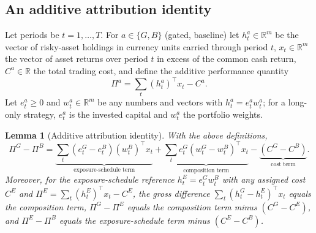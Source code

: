 \documentclass[11pt]{article}
\newtheorem{lemma}[proposition]{Lemma}
\theoremstyle{remark}
\begin{document}
\subsection{An additive attribution identity}

Let periods be $t=1,\dots,T$. For $a\in\{G,B\}$ (gated, baseline) let $h_t^a\in\mathbb{R}^m$ be
the vector of risky-asset holdings in currency units carried through period $t$,
$x_t\in\mathbb{R}^m$ the vector of asset returns over period $t$ in excess of the common cash
return, $C^a\in\mathbb{R}$ the total trading cost, and define the additive performance quantity
\[
\Pi^a=\sum_t(h_t^a)^\top x_t-C^a .
\]
Let $e_t^a\ge0$ and $w_t^a\in\mathbb{R}^m$ be any numbers and vectors with
$h_t^a=e_t^aw_t^a$; for a long-only strategy, $e_t^a$ is the invested capital and $w_t^a$ the
portfolio weights.

\begin{lemma}[Additive attribution identity]
\label{lem:attribution}
With the above definitions,
\begin{equation}
\Pi^G-\Pi^B
=\underbrace{\sum_t(e_t^G-e_t^B)(w_t^B)^\top x_t}_{\text{exposure-schedule term}}
+\underbrace{\sum_te_t^G(w_t^G-w_t^B)^\top x_t}_{\text{composition term}}
-\underbrace{(C^G-C^B)}_{\text{cost term}} .
\label{eq:attribution}
\end{equation}
Moreover, for the exposure-schedule reference $h_t^E=e_t^Gw_t^B$ with any assigned cost $C^E$
and $\Pi^E=\sum_t(h_t^E)^\top x_t-C^E$, the gross difference
$\sum_t(h_t^G-h_t^E)^\top x_t$ equals the composition term,
$\Pi^G-\Pi^E$ equals the composition term minus $(C^G-C^E)$, and $\Pi^E-\Pi^B$ equals the
exposure-schedule term minus $(C^E-C^B)$.
\end{lemma}
\end{document}
